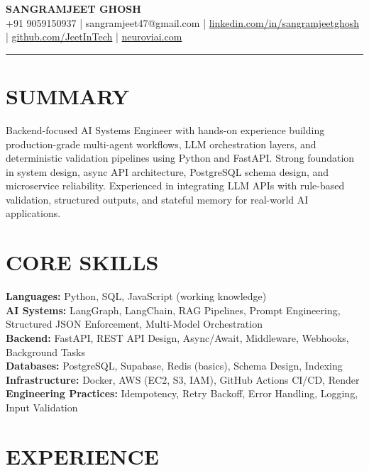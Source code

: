 \documentclass[10pt]{article}
\begin{document}
\begin{center}
{\Large \textbf{SANGRAMJEET GHOSH}} \\[2pt]
{\small +91 9059150937 \;|\; sangramjeet47@gmail.com \;|\;
\href{https://www.linkedin.com/in/sangramjeetghosh}{linkedin.com/in/sangramjeetghosh} \;|\;
\href{https://github.com/JeetInTech}{github.com/JeetInTech} \;|\;
\href{https://neuroviai.com}{neuroviai.com}}
\end{center}

\noindent\rule{\textwidth}{0.4pt}

\section*{SUMMARY}
Backend-focused AI Systems Engineer with hands-on experience building production-grade multi-agent workflows, LLM orchestration layers, and deterministic validation pipelines using Python and FastAPI. Strong foundation in system design, async API architecture, PostgreSQL schema design, and microservice reliability. Experienced in integrating LLM APIs with rule-based validation, structured outputs, and stateful memory for real-world AI applications.

\section*{CORE SKILLS}
\textbf{Languages:} Python, SQL, JavaScript (working knowledge) \\
\textbf{AI Systems:} LangGraph, LangChain, RAG Pipelines, Prompt Engineering, Structured JSON Enforcement, Multi-Model Orchestration \\
\textbf{Backend:} FastAPI, REST API Design, Async/Await, Middleware, Webhooks, Background Tasks \\
\textbf{Databases:} PostgreSQL, Supabase, Redis (basics), Schema Design, Indexing \\
\textbf{Infrastructure:} Docker, AWS (EC2, S3, IAM), GitHub Actions CI/CD, Render \\
\textbf{Engineering Practices:} Idempotency, Retry Backoff, Error Handling, Logging, Input Validation

\section*{EXPERIENCE}
\end{document}

